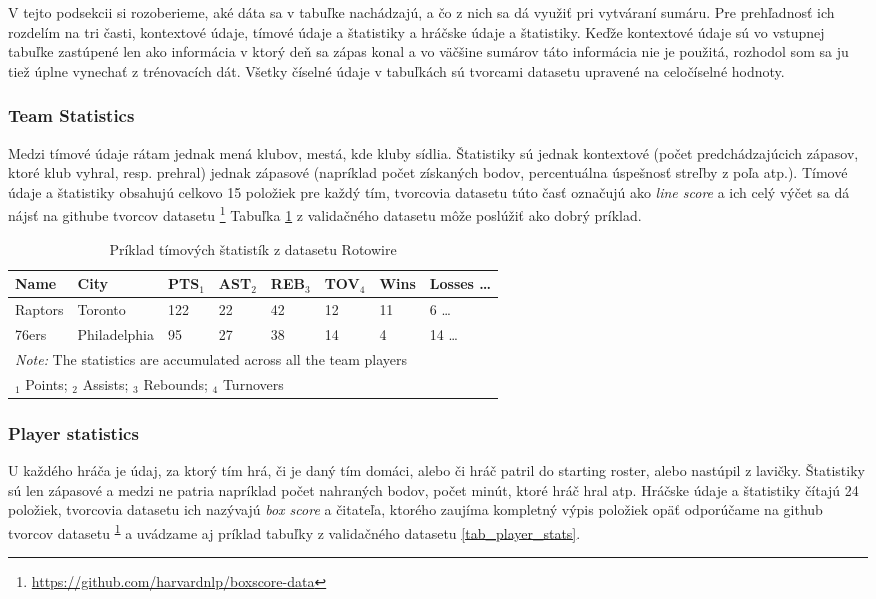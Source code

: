 V tejto podsekcii si rozoberieme, aké dáta sa v tabuľke nachádzajú, a čo z nich sa dá využiť pri vytváraní sumáru. Pre prehľadnosť ich rozdelím na tri časti, kontextové údaje, tímové údaje a štatistiky a hráčske údaje a štatistiky. Keďže kontextové údaje sú vo vstupnej tabuľke zastúpené len ako informácia v ktorý deň sa zápas konal a vo väčšine sumárov táto informácia nie je použitá, rozhodol som sa ju tiež úplne vynechať z trénovacích dát. Všetky číselné údaje v tabuľkách sú tvorcami datasetu upravené na celočíselné hodnoty.

\subsubsection{Team Statistics}

Medzi tímové údaje rátam jednak mená klubov, mestá, kde kluby sídlia. \linebreak[4] Štatistiky sú jednak kontextové (počet predchádzajúcich zápasov, ktoré klub vyhral, resp. prehral) jednak zápasové (napríklad počet získaných bodov, percentuálna úspešnosť streľby z poľa atp.). Tímové údaje a štatistiky obsahujú celkovo 15 položiek pre každý tím, tvorcovia datasetu túto časť označujú ako \emph{line score} a ich celý výčet sa dá nájsť na githube tvorcov datasetu \footnote{\label{note1}\url{https://github.com/harvardnlp/boxscore-data}} Tabuľka \ref{tab_team_stats} z validačného datasetu môže poslúžiť ako dobrý príklad.

\begin{table}[bh!]
    \begin{tabular}{llllllll}
        \toprule
        Name    & City         & PTS$_1$ & AST$_2$ & REB$_3$ & TOV$_4$ & Wins & Losses  \dots \\
        \midrule
        Raptors & Toronto      & 122 & 22  & 42  & 12  & 11   & 6       \dots \\
        76ers   & Philadelphia & 95  & 27  & 38  & 14  & 4    & 14      \dots \\
        \bottomrule
        \multicolumn{8}{l}{\footnotesize \textit{Note:} The statistics are accumulated across all the team players} \\
        \multicolumn{8}{l}{\footnotesize $_1$ Points; $_2$ Assists; $_3$ Rebounds; $_4$ Turnovers}
    \end{tabular}
    \caption{Príklad tímových štatistík z datasetu Rotowire} \label{tab_team_stats}
\end{table}

\subsubsection{Player statistics}
U každého hráča je údaj, za ktorý tím hrá, či je daný tím domáci, alebo či hráč patril do starting roster, alebo nastúpil z lavičky. Štatistiky sú len zápasové a medzi ne patria napríklad počet nahraných bodov, počet minút, ktoré hráč hral atp. Hráčske údaje a štatistiky čítajú 24 položiek, tvorcovia datasetu ich nazývajú \emph{box score} a čitateľa, ktorého zaujíma kompletný výpis položiek opäť odporúčame na github tvorcov datasetu \textsuperscript{\ref{note1}} a uvádzame aj príklad tabuľky z validačného datasetu \ref{tab_player_stats}.

